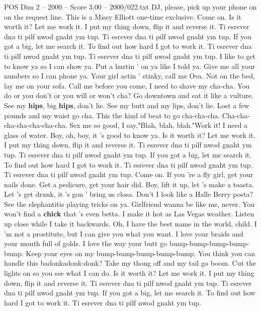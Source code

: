 \begin{textsample}{POS Dim 2 – 2000 – Score 3.00 – 2000/022.txt}  \label{ex:f2_pos_005}
DJ, please, pick up your phone on on the request line.
This is a Missy Elliott one-time exclusive.
Come on.
Is it worth it?
Let me work it.
I put my thing down, flip it and reverse it.
Ti esrever dna ti pilf nwod gnaht ym tup.
Ti esrever dna ti pilf nwod gnaht ym tup.
If you got a big, let me search it.
To find out how hard I got to work it.
Ti esrever dna ti pilf nwod gnaht ym tup.
Ti esrever dna ti pilf nwod gnaht ym tup.
I like to get to know ya so I can show ya.
Put a hurtin ' on ya like I told ya.
Give me all your numbers so I can phone ya.
Your girl actin ' stinky, call me Ova.
Not on the bed, lay me on your sofa.
Call me before you come, I need to shave my cha-cha.
You do or you don't or you will or won't cha?
Go downtown and eat it like a vulture.
See my \textbf{hips}, big \textbf{hips}, don't lie.
See my butt and my lips, don't lie.
Lost a few pounds and my waist go cha.
This the kind of beat to go cha-cha-cha.
Cha-cha-cha-cha-cha-cha-cha.
Sex me so good, I say,"Blah, blah, blah."Work it!
I need a glass of water.
Boy, oh, boy, it 's good to know ya.
Is it worth it?
Let me work it.
I put my thing down, flip it and reverse it.
Ti esrever dna ti pilf nwod gnaht ym tup.
Ti esrever dna ti pilf nwod gnaht ym tup.
If you got a big, let me search it.
To find out how hard I got to work it.
Ti esrever dna ti pilf nwod gnaht ym tup.
Ti esrever dna ti pilf nwod gnaht ym tup.
Come on.
If you 're a fly girl, get your nails done.
Get a pedicure, get your hair did.
Boy, lift it up, let 's make a toasta.
Let 's get drunk, it 's gon ' bring us closa.
Don't I look like a Halle Berry posta?
See the elephantitis playing tricks on ya.
Girlfriend wanna be like me, never.
You won't find a \textbf{chick} that 's even betta.
I make it hot as Las Vegas weather.
Listen up close while I take it backwards.
Oh, I have the best name in the world, child.
I 'm not a prostitute, but I can give you what you want.
I love your braids and your mouth full of golds.
I love the way your butt go bump-bump-bump-bump-bump.
Keep your eyes on my bump-bump-bump-bump-bump.
You think you can handle this badonkadonk-donk?
Take my thong off and my tail go boom.
Cut the lights on so you see what I can do.
Is it worth it?
Let me work it.
I put my thing down, flip it and reverse it.
Ti esrever dna ti pilf nwod gnaht ym tup.
Ti esrever dna ti pilf nwod gnaht ym tup.
If you got a big, let me search it.
To find out how hard I got to work it.
Ti esrever dna ti pilf nwod gnaht ym tup.

\end{textsample}
